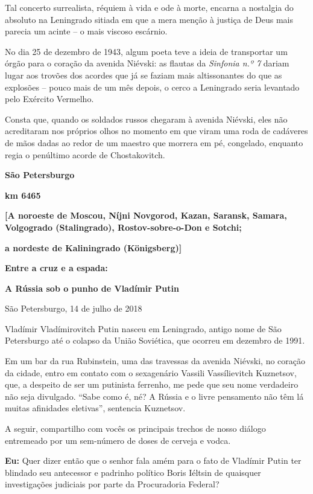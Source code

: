 Tal concerto surrealista, réquiem à vida e ode à morte, encarna a
nostalgia do absoluto na Leningrado sitiada em que a mera menção à
justiça de Deus mais parecia um acinte -- o mais viscoso escárnio.

No dia 25 de dezembro de 1943, algum poeta teve a ideia de transportar
um órgão para o coração da avenida Niévski: as flautas da \emph{Sinfonia
n.º 7} dariam lugar aos trovões dos acordes que já se faziam mais
altissonantes do que as explosões -- pouco mais de um mês depois, o
cerco a Leningrado seria levantado pelo Exército Vermelho.

Consta que, quando os soldados russos chegaram à avenida Niévski, eles
não acreditaram nos próprios olhos no momento em que viram uma roda de
cadáveres de mãos dadas ao redor de um maestro que morrera em pé,
congelado, enquanto regia o penúltimo acorde de Chostakovitch.

\textbf{São Petersburgo}

\textbf{km 6465}

\textbf{{[}A noroeste de Moscou, Níjni Novgorod, Kazan, Saransk, Samara,
Volgogrado (Stalingrado), Rostov-sobre-o-Don e Sotchi;}

\textbf{a nordeste de Kaliningrado (Königsberg){]}}

\textbf{Entre a cruz e a espada: }

\textbf{A Rússia sob o punho de Vladímir Putin}

São Petersburgo, 14 de julho de 2018

Vladímir Vladímirovitch Putin nasceu em Leningrado, antigo nome de São
Petersburgo até o colapso da União Soviética, que ocorreu em dezembro de
1991.

Em um bar da rua Rubinstein, uma das travessas da avenida Niévski, no
coração da cidade, entro em contato com o sexagenário Vassili
Vassílievitch Kuznetsov, que, a despeito de ser um putinista ferrenho,
me pede que seu nome verdadeiro não seja divulgado. ``Sabe como é, né? A
Rússia e o livre pensamento não têm lá muitas afinidades eletivas'',
sentencia Kuznetsov.

A seguir, compartilho com vocês os principais trechos de nosso diálogo
entremeado por um sem-número de doses de cerveja e vodca.

\textbf{Eu:} Quer dizer então que o senhor fala amém para o fato de
Vladímir Putin ter blindado seu antecessor e padrinho político Boris
Iéltsin de quaisquer investigações judiciais por parte da Procuradoria
Federal?

